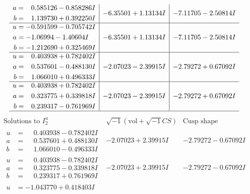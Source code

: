 \documentclass[1p]{elsarticle_modified}
\theoremstyle{definition}
\newcommand{\I}{\sqrt{-1}}
\begin{document}
$$\begin{array}{c|c|c}
\begin{aligned}
a &= \phantom{-}0.585126 - 0.858286 I \\
b &= \phantom{-}1.139730 + 0.392250 I\end{aligned}
 & -6.35501 + 1.13134 I & -7.11705 - 2.50814 I \\ \hline\begin{aligned}
u &= -0.591599 - 0.705742 I \\
a &= -1.06994 - 1.40604 I \\
b &= -1.212690 + 0.325469 I\end{aligned}
 & -6.35501 + 1.13134 I & -7.11705 - 2.50814 I \\ \hline\begin{aligned}
u &= \phantom{-}0.403938 + 0.782402 I \\
a &= \phantom{-}0.537601 - 0.488130 I \\
b &= \phantom{-}1.066010 + 0.496333 I\end{aligned}
 & -2.07023 - 2.39915 I & -2.79272 + 0.67092 I \\ \hline\begin{aligned}
u &= \phantom{-}0.403938 + 0.782402 I \\
a &= \phantom{-}0.323775 + 0.339818 I \\
b &= \phantom{-}0.239317 - 0.761969 I\end{aligned}
 & -2.07023 - 2.39915 I & -2.79272 + 0.67092 I\\
 \hline 
 \end{array}$$\newpage$$\begin{array}{c|c|c}  
\text{Solutions to }I^u_{2}& \I (\text{vol} + \sqrt{-1}CS) & \text{Cusp shape}\\
 \hline 
\begin{aligned}
u &= \phantom{-}0.403938 - 0.782402 I \\
a &= \phantom{-}0.537601 + 0.488130 I \\
b &= \phantom{-}1.066010 - 0.496333 I\end{aligned}
 & -2.07023 + 2.39915 I & -2.79272 - 0.67092 I \\ \hline\begin{aligned}
u &= \phantom{-}0.403938 - 0.782402 I \\
a &= \phantom{-}0.323775 - 0.339818 I \\
b &= \phantom{-}0.239317 + 0.761969 I\end{aligned}
 & -2.07023 + 2.39915 I & -2.79272 - 0.67092 I \\ \hline\begin{aligned}
u &= -1.043770 + 0.418403 I \\

\end{aligned}
\end{array}$$
\end{document}
